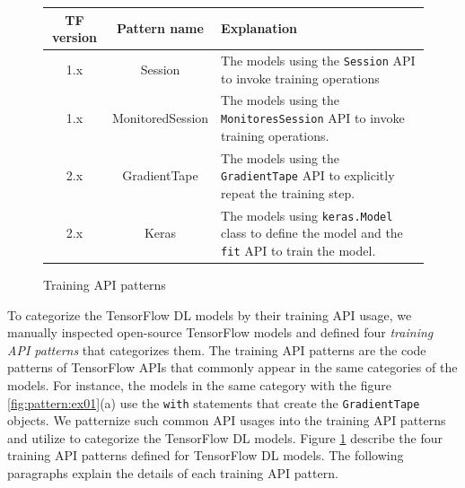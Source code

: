 \begin{figure}[ht!]
  \centering
  \begin{tabular}{|c|c|l|}
    \hline
    TF version & Pattern name & Explanation \\
    \hline
    1.x & Session & 
	  The models using the {\tt Session} API to invoke training operations\\
    \hline
    1.x & MonitoredSession & 
	  The models using the {\tt MonitoresSession} API to invoke 
	  training operations.\\
    \hline
    2.x & GradientTape & 
	  The models using the {\tt GradientTape} API to explicitly 
	  repeat the training step.\\
    \hline
    2.x & Keras & 
	  The models using {\tt keras.Model} class to define the model
	  and the {\tt fit} API to train the model.\\
    \hline
  \end{tabular}
  \caption{Training API patterns}
  \label{tab:patterns}
\end{figure}

To categorize the TensorFlow DL models by their training API usage,
we manually inspected open-source TensorFlow models and
defined four \textit{training API patterns} that categorizes them.
The training API patterns are the code patterns of TensorFlow APIs 
that commonly appear in the same categories of the models.
For instance, the models in the same category with the figure
\ref{fig:pattern:ex01}(a) use the {\tt with} statements that create the
{\tt GradientTape} objects.
We patternize such common API usages into the training API patterns and
utilize to categorize the TensorFlow DL models.
Figure \ref{tab:patterns} describe the four training API patterns defined
for TensorFlow DL models.
The following paragraphs explain the details of each training API pattern.





